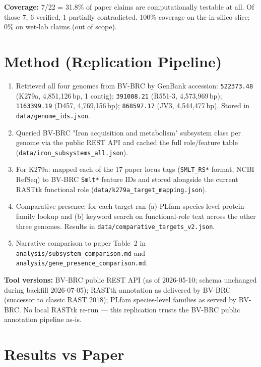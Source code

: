 \documentclass[10pt,a4paper]{article}
\begin{document}
\noindent\textbf{Coverage:} 7/22 = 31.8\% of paper claims are computationally
testable at all. Of those 7, 6 verified, 1 partially contradicted.
100\% coverage on the in-silico slice; 0\% on wet-lab claims (out of scope).

\section{Method (Replication Pipeline)}
\begin{enumerate}[leftmargin=1.4em,itemsep=2pt]
  \item Retrieved all four genomes from BV-BRC by GenBank accession:
        \texttt{522373.48} (K279a, 4{,}851{,}126\,bp, 1 contig);
        \texttt{391008.21} (R551-3, 4{,}573{,}969\,bp);
        \texttt{1163399.19} (D457, 4{,}769{,}156\,bp);
        \texttt{868597.17} (JV3, 4{,}544{,}477\,bp). Stored in
        \texttt{data/genome\_ids.json}.
  \item Queried BV-BRC "Iron acquisition and metabolism" subsystem class per
        genome via the public REST API and cached the full role/feature table
        (\texttt{data/iron\_subsystems\_all.json}).
  \item For K279a: mapped each of the 17 paper locus tags (\texttt{SMLT\_RS*}
        format, NCBI RefSeq) to BV-BRC \texttt{Smlt*} feature IDs and stored
        alongside the current RASTtk functional role
        (\texttt{data/k279a\_target\_mapping.json}).
  \item Comparative presence: for each target ran (a) PLfam species-level
        protein-family lookup and (b) keyword search on functional-role text
        across the other three genomes. Results in
        \texttt{data/comparative\_targets\_v2.json}.
  \item Narrative comparison to paper Table~2 in \texttt{analysis/subsystem\_comparison.md}
        and \texttt{analysis/gene\_presence\_comparison.md}.
\end{enumerate}

\noindent\textbf{Tool versions:} BV-BRC public REST API (as of 2026-05-10;
schema unchanged during backfill 2026-07-05); RASTtk annotation as delivered
by BV-BRC (successor to classic RAST 2018); PLfam species-level families as
served by BV-BRC. No local RASTtk re-run --- this replication trusts the
BV-BRC public annotation pipeline as-is.

\section{Results vs Paper}
\end{document}
